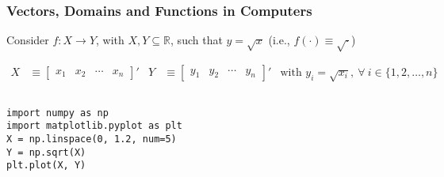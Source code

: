 \documentclass[10pt, aspectratio=1610, handout]{beamer}
\begin{document}
  \begin{frame}
    \frametitle{Vectors, Domains and Functions in Computers} \label{apx:grid_example}

    Consider $f : X \to Y$, with $X, Y \subseteq \mathbb{R}$, such that $y = \sqrt{x}$ (i.e., $f(\cdot) \equiv \sqrt{\cdot}$)

    \vfill

    \begin{align*}
      X &\equiv
      \begin{bmatrix}
        x_1 & x_2 & \cdots & x_n
      \end{bmatrix}'
      &
      Y &\equiv
      \begin{bmatrix}
        y_1 & y_2 & \cdots & y_n
      \end{bmatrix}'
      &
      \text{with } y_i = \sqrt{x_i},\ \forall\ i \in \{1, 2, \ldots, n\}
    \end{align*}

    \vfill

    \begin{columns}
      \begin{column}{0.475\textwidth}
        \texttt{import numpy as np} \\
        \texttt{import matplotlib.pyplot as plt} \\
        \texttt{X = np.linspace(0, 1.2, num=5)} \\
        \texttt{Y = np.sqrt(X)} \\
        \texttt{plt.plot(X, Y)}
      \end{column}
      \begin{column}{0.375\textwidth}
        \begin{figure}
          \centering
        \end{figure}
      \end{column}
    \end{columns}

    \vfill

    \hfill {}

  \end{frame}
\end{document}
